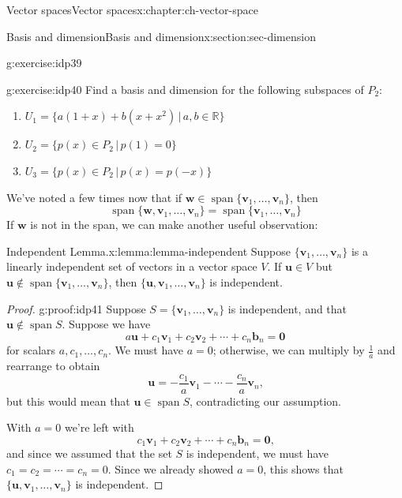 \documentclass[oneside,10pt,]{book}
\numberwithin{equation}{section}
\newcommand{\spn}{\operatorname{span}}
\newcommand{\R}{\mathbb{R}}
\newcommand{\uu}{\mathbf{u}}
\newcommand{\vv}{\mathbf{v}}
\newcommand{\ww}{\mathbf{w}}
\begin{document}
\begin{chapterptx}{Vector spaces}{}{Vector spaces}{}{}{x:chapter:ch-vector-space}
\begin{sectionptx}{Basis and dimension}{}{Basis and dimension}{}{}{x:section:sec-dimension}
\begin{inlineexercise}{}{g:exercise:idp39}
\end{inlineexercise}%
\begin{inlineexercise}{}{g:exercise:idp40}%
Find a basis and dimension for the following subspaces of \(P_2\):%
\begin{enumerate}[label=\alph*]
\item{}\(\displaystyle U_1 = \{a(1+x)+b(x+x^2)\,|\, a,b\in\R\}\)%
\item{}\(\displaystyle U_2=\{p(x)\in P_2 \,|\, p(1)=0\}\)%
\item{}\(\displaystyle U_3 = \{p(x)\in P_2 \,|\, p(x)=p(-x)\}\)%
\end{enumerate}
%
\end{inlineexercise}%
We've noted a few times now that if \(\ww\in\spn\{\vv_1,\ldots, \vv_n\}\), then%
\begin{equation*}
\spn\{\ww,\vv_1,\ldots, \vv_n\}=\spn\{\vv_1,\ldots, \vv_n\}
\end{equation*}
If \(\ww\) is not in the span, we can make another useful observation:%
\begin{lemma}{Independent Lemma.}{}{x:lemma:lemma-independent}%
Suppose \(\{\vv_1,\ldots, \vv_n\}\) is a linearly independent set of vectors in a vector space \(V\). If \(\uu\in V\) but \(\uu\notin \spn\{\vv_1,\ldots, \vv_n\}\), then \(\{\uu,\vv_1,\ldots, \vv_n\}\) is independent.%
\end{lemma}
\begin{proof}{}{g:proof:idp41}
Suppose \(S=\{\vv_1,\ldots, \vv_n\}\) is independent, and that \(\uu\notin\spn S\). Suppose we have%
\begin{equation*}
a\uu+c_1\vv_1+c_2\vv_2+\cdots +c_n\mathbf{b}_n=\mathbf{0}
\end{equation*}
for scalars \(a,c_1,\ldots, c_n\). We must have \(a=0\); otherwise, we can multiply by \(\frac1a\) and rearrange to obtain%
\begin{equation*}
\uu = -\frac{c_1}{a}\vv_1-\cdots -\frac{c_n}{a}\vv_n\text{,}
\end{equation*}
but this would mean that \(\uu\in \spn S\), contradicting our assumption.%
\par
With \(a=0\) we're left with%
\begin{equation*}
c_1\vv_1+c_2\vv_2+\cdots +c_n\mathbf{b}_n=\mathbf{0}\text{,}
\end{equation*}
and since we assumed that the set \(S\) is independent, we must have \(c_1=c_2=\cdots=c_n=0\). Since we already showed \(a=0\), this shows that \(\{\uu,\vv_1,\ldots, \vv_n\}\) is independent.%
\end{proof}

\end{sectionptx}
\end{chapterptx}
\end{document}
